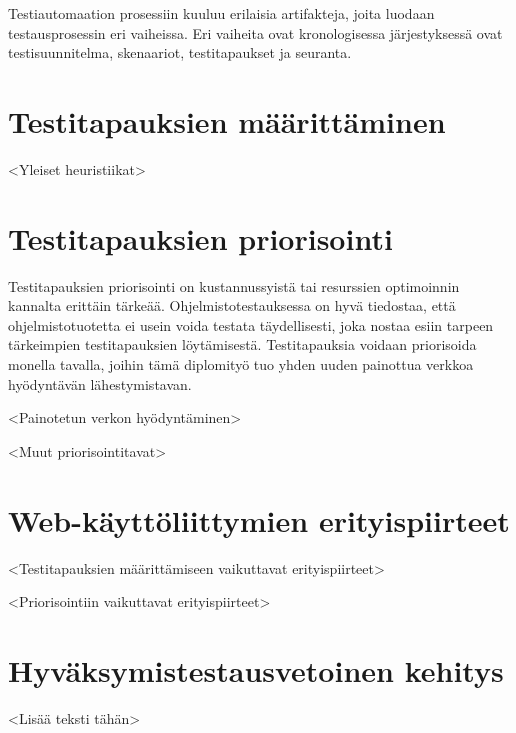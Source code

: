 Testiautomaation prosessiin kuuluu erilaisia artifakteja, joita luodaan testausprosessin eri vaiheissa.
Eri vaiheita ovat kronologisessa järjestyksessä ovat testisuunnitelma, skenaariot, testitapaukset ja seuranta.

\section{Testitapauksien määrittäminen}

<Yleiset heuristiikat>

\section{Testitapauksien priorisointi}

Testitapauksien priorisointi on kustannussyistä tai resurssien optimoinnin kannalta erittäin tärkeää.
Ohjelmistotestauksessa on hyvä tiedostaa, että ohjelmistotuotetta ei usein voida testata täydellisesti, joka nostaa esiin tarpeen tärkeimpien testitapauksien löytämisestä.
Testitapauksia voidaan priorisoida monella tavalla, joihin tämä diplomityö tuo yhden uuden painottua verkkoa hyödyntävän lähestymistavan.

<Painotetun verkon hyödyntäminen>

<Muut priorisointitavat>

\section{Web-käyttöliittymien erityispiirteet}

<Testitapauksien määrittämiseen vaikuttavat erityispiirteet>

<Priorisointiin vaikuttavat erityispiirteet>

\section{Hyväksymistestausvetoinen kehitys}

<Lisää teksti tähän>
